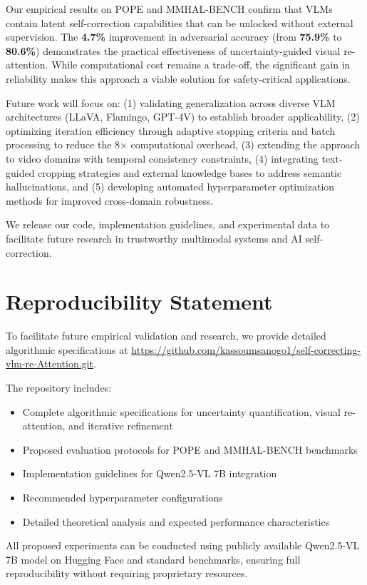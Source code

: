 \documentclass[12pt]{article}
\begin{document}
Our empirical results on POPE and MMHAL-BENCH confirm that VLMs contain latent self-correction capabilities that can be unlocked without external supervision. The \textbf{4.7\%} improvement in adversarial accuracy (from \textbf{75.9\%} to \textbf{80.6\%}) demonstrates the practical effectiveness of uncertainty-guided visual re-attention. While computational cost remains a trade-off, the significant gain in reliability makes this approach a viable solution for safety-critical applications.

Future work will focus on: (1) validating generalization across diverse VLM architectures (LLaVA, Flamingo, GPT-4V) to establish broader applicability, (2) optimizing iteration efficiency through adaptive stopping criteria and batch processing to reduce the 8× computational overhead, (3) extending the approach to video domains with temporal consistency constraints, (4) integrating text-guided cropping strategies and external knowledge bases to address semantic hallucinations, and (5) developing automated hyperparameter optimization methods for improved cross-domain robustness.

We release our code, implementation guidelines, and experimental data to facilitate future research in trustworthy multimodal systems and AI self-correction.



\section*{Reproducibility Statement}

To facilitate future empirical validation and research, we provide detailed algorithmic specifications at \url{https://github.com/kassoumsanogo1/self-correcting-vlm-re-Attention.git}.

The repository includes:
\begin{itemize}
\item Complete algorithmic specifications for uncertainty quantification, visual re-attention, and iterative refinement
\item Proposed evaluation protocols for POPE and MMHAL-BENCH benchmarks
\item Implementation guidelines for Qwen2.5-VL 7B integration
\item Recommended hyperparameter configurations
\item Detailed theoretical analysis and expected performance characteristics
\end{itemize}

All proposed experiments can be conducted using publicly available Qwen2.5-VL 7B model on Hugging Face and standard benchmarks, ensuring full reproducibility without requiring proprietary resources.



\end{document}
